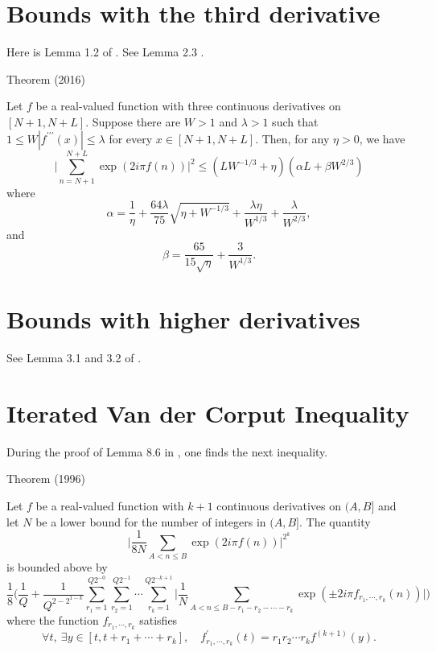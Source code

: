   
\par 
\section{Bounds with the third derivative}


Here is Lemma 1.2 of
  \cite{Hiary*16}.
  See Lemma 2.3
  \cite{Patel*22}.

\par 
\begin{thm}{Theorem (2016)}

  Let $f$ be a real-valued function with three continuous derivatives
  on $[N+1, N+L]$. Suppose there are $W > 1$ and $\lambda > 1$ such
  that $1 \le W |f^{\prime\prime\prime}(x)| \le \lambda$ for every $x\in [N+1,
  N+L]$. Then, for any $\eta > 0$, we have
  $$
  \biggl|\sum_{n= N+1}^{N+L}
  \exp( 2i\pi f(n)) \biggr|^2
  \le (LW^{-1/3} +\eta) (\alpha L + \beta W^{2/3})
  $$
  where
  $$
  \alpha = \frac{1}{\eta} +\frac{64\lambda}{75}
  \sqrt{\eta + W^{-1/3}}+\frac{\lambda\eta}{W^{1/3}}
  +\frac{\lambda}{W^{2/3}},
  $$
  and
  $$
  \beta = \frac{65}{15\sqrt{\eta}} + \frac{3}{W^{1/3}}.
  $$
\end{thm}


  
\par 
\section{Bounds with higher derivatives}


  See Lemma 3.1 and 3.2 of
    \cite{Patel*22}.

  \par 
\section{Iterated Van der Corput Inequality}


During the proof of Lemma 8.6 in 
  \cite{Granville-Ramare*96},
  one finds the next inequality.
\par 
\begin{thm}{Theorem (1996)}

  Let $f$ be a real-valued function with $k+1$ continuous derivatives
  on $(A, B]$ and let $N$ be a lower bound for the number of integers
  in $(A,B]$. The quantity
  $$
  \biggl|\frac{1}{8N}
  \sum_{A < n\le B} \exp(2 i \pi f(n))\biggr|^{2^k}
	    $$
	    is bounded above by
	    $$
	    \frac{1}{8}\biggl(
	    \frac{1}{Q} + \frac{1}{Q^{2-2^{1-k}}}
	    \sum_{r_1 =1}^{Q2^{-0}}
	    \sum_{r_2 =1}^{Q2^{-1}}
	    \cdots
	    \sum_{r_k =1}^{Q2^{-k+1}}
	    \biggl|
	    \frac{1}{N}
	    \sum_{A < n \le B-r_1-r_2-\cdots-r_k}
		    \exp(\pm 2i\pi f_{r_1,\cdots,r_k}(n))   
	    \biggr|
	    \biggr)
		      $$
		      where the function $f_{r_1,\cdots,r_k}$ satisfies
		      $$
		      \forall t,\ \exists y\in[t, t + r_1 + \cdots + r_k],
		      \quad
		      f^{\prime}_{r_1,\cdots, r_k}(t) = r_1r_2\cdots r_k f^{(k+1)}(y).
		      $$
\end{thm}



